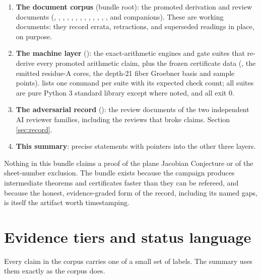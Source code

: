 \documentclass[11pt]{article}
\theoremstyle{definition}
\theoremstyle{remark}
\begin{document}
\begin{enumerate}
\item \textbf{The document corpus} (bundle root): the promoted derivation and
review documents (, , , ,
, , , ,
, , , ,
, and companions). These are working documents: they record
errata, retractions, and superseded readings in place, on purpose.
\item \textbf{The machine layer} (): the exact-arithmetic engines and
gate suites that re-derive every promoted arithmetic claim, plus the frozen
certificate data (, the emitted residue-A cores, the
depth-21 fiber Groebner basis and sample points).  lists
one command per suite with its expected check count; all suites are pure
Python 3 standard library except where noted, and all exit 0.
\item \textbf{The adversarial record} (): the review documents of the
two independent AI reviewer families, including the reviews that broke
claims. Section \ref{sec:record}.
\item \textbf{This summary}: precise statements with pointers into the other
three layers.
\end{enumerate}

Nothing in this bundle claims a proof of the plane Jacobian Conjecture or of
the sheet-number exclusion. The bundle exists because the campaign produces
intermediate theorems and certificates faster than they can be refereed, and
because the honest, evidence-graded form of the record, including its named
gaps, is itself the artifact worth timestamping.

\section{Evidence tiers and status language}\label{sec:tiers}

Every claim in the corpus carries one of a small set of labels. The summary
uses them exactly as the corpus does.
\end{document}
